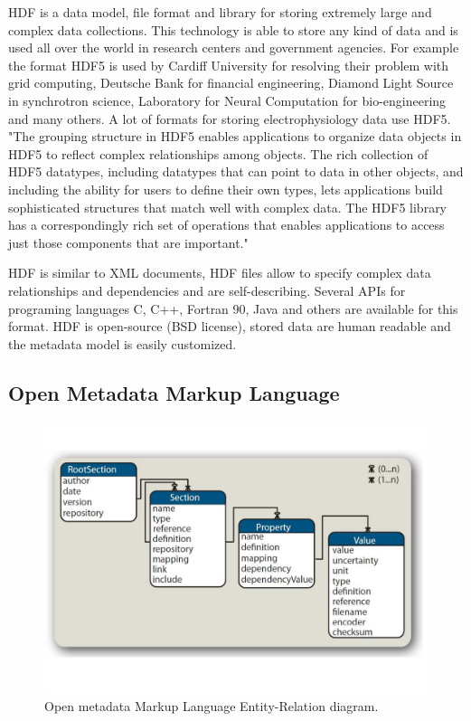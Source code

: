 \documentclass[conference]{IEEEtran}
\begin{document}
HDF is a data model, file format and library for storing extremely large and complex data collections. This technology is able to store any kind of data and is used all over the world in research centers and government agencies. For example the format HDF5 is used by Cardiff University for resolving their problem with grid computing, Deutsche Bank for financial engineering, Diamond Light Source in synchrotron science, Laboratory for Neural Computation for bio-engineering and many others. A lot of formats for storing electrophysiology data use HDF5.
"The grouping structure in HDF5 enables applications to organize data objects in HDF5 to reflect complex relationships among objects. The rich collection of HDF5 datatypes, including datatypes that can point to data in other objects, and including the ability for users to define their own types, lets applications build sophisticated structures that match well with complex data. The HDF5 library has a correspondingly rich set of operations that enables applications to access just those components that are important." \cite{hdf}


HDF is similar to XML documents, HDF files allow to specify complex data relationships and dependencies and are self-describing. Several APIs for programing languages C, C++, Fortran 90, Java and others are available for this format.
HDF is open-source (BSD license), stored data are human readable and the metadata model is easily customized.

\subsection{Open Metadata Markup Language}

\begin{figure}[!t]
\centering
\includegraphics[scale=0.3]{obrazky/odml_tree.pdf}
\caption{Open metadata Markup Language Entity-Relation diagram. \cite{odml}}
\label{odml-tree}
\end{figure}
	
\end{document}
